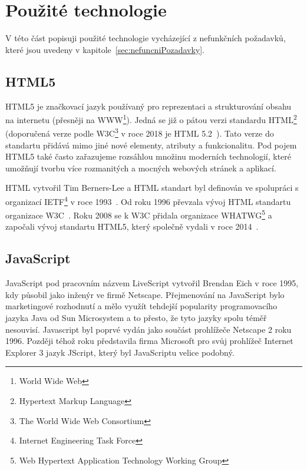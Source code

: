 
\section{Použité technologie}\label{sec:technologie}
V této část popisuji použité technologie vycházející z nefunkčních požadavků, které jsou uvedeny v kapitole~\ref{sec:nefuncniPozadavky}.

\subsection{HTML5}\label{subsec:html5}

HTML5 je značkovací jazyk používaný pro reprezentaci a strukturování  obsahu na internetu (přesněji na WWW\footnote{World Wide Web}).
Jedná se již o pátou verzi standardu HTML\footnote{Hypertext Markup Language} (doporučená verze podle W3C\footnote{The World Wide Web Consortium} v roce 2018 je HTML 5.2~\cite{w3c:html52}).
Tato verze do standartu přidává mimo jiné nové elementy, atributy a funkcionalitu.
Pod pojem HTML5 také často zařazujeme rozsáhlou množinu moderních technologií, které umožňují tvorbu více rozmanitých a mocných webových stránek a aplikací.~\cite{mozzila:html5}

HTML vytvořil Tim Berners-Lee a HTML standart byl definován ve spolupráci s organizací IETF\footnote{Internet Engineering Task Force} v roce 1993~\cite{html:autor}.
Od roku 1996 převzala vývoj HTML standartu organizace W3C~\cite{w3c:html32}.
Roku 2008 se k W3C přidala organizace WHATWG\footnote{Web Hypertext Application Technology Working Group} a započali vývoj standartu HTML5, který společně vydali v roce 2014~\cite{w3c:html5}.


\subsection{JavaScript}\label{subsec:javascript}

JavaScript pod pracovním názvem LiveScript vytvořil Brendan Eich v roce 1995, kdy působil jako inženýr ve firmě Netscape.
Přejmenování na JavaScript bylo marketingové rozhodnutí a mělo využít tehdejší popularity programovacího jazyka Java od Sun Microsystem a to přesto, že tyto jazyky spolu téměř nesouvisí.
Javascript byl poprvé vydán jako součást prohlížeče Netscape 2 roku 1996.
Později téhož roku představila firma Microsoft pro svůj prohlížeč Internet Explorer 3 jazyk JScript, který byl JavaScriptu velice podobný.~\cite{mozzila:javascript}

